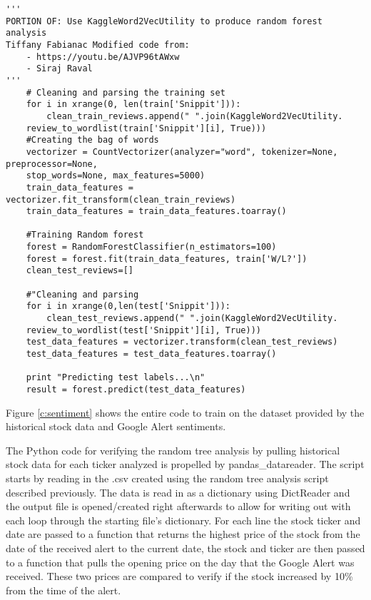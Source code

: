 \documentclass[sigconf]{acmart}
\begin{document}
\begin{figure*}[htb]
\begin{verbatim}
'''
PORTION OF: Use KaggleWord2VecUtility to produce random forest analysis 
Tiffany Fabianac Modified code from:
    - https://youtu.be/AJVP96tAWxw
    - Siraj Raval
'''
    # Cleaning and parsing the training set
    for i in xrange(0, len(train['Snippit'])):
        clean_train_reviews.append(" ".join(KaggleWord2VecUtility.
    review_to_wordlist(train['Snippit'][i], True)))
    #Creating the bag of words
    vectorizer = CountVectorizer(analyzer="word", tokenizer=None, preprocessor=None, 
    stop_words=None, max_features=5000)
    train_data_features = vectorizer.fit_transform(clean_train_reviews)
    train_data_features = train_data_features.toarray()

    #Training Random forest
    forest = RandomForestClassifier(n_estimators=100)
    forest = forest.fit(train_data_features, train['W/L?'])
    clean_test_reviews=[]

    #"Cleaning and parsing
    for i in xrange(0,len(test['Snippit'])):
        clean_test_reviews.append(" ".join(KaggleWord2VecUtility.
    review_to_wordlist(test['Snippit'][i], True)))
    test_data_features = vectorizer.transform(clean_test_reviews)
    test_data_features = test_data_features.toarray()

    print "Predicting test labels...\n"
    result = forest.predict(test_data_features)
\end{verbatim}
\caption{The Sentiment Python code takes the .csv exported by the historical stock script and parses the Snippets to train on the stock script and apply it to more recent stock quotes and Google Alerts}\label{c:sentiment}
\end{figure*}

Figure \ref{c:sentiment} shows the entire code to train on the dataset provided by the historical stock data and Google Alert sentiments.

The Python code for verifying the random tree analysis by pulling historical stock data for each ticker analyzed is propelled by pandas\_datareader. The script starts by reading in the .csv created using the random tree analysis script described previously. The data is read in as a dictionary using DictReader and the output file is opened/created right afterwards to allow for writing out with each loop through the starting file's dictionary. For each line the stock ticker and date are passed to a function that returns the highest price of the stock from the date of the received alert to the current date, the stock and ticker are then passed to a function that pulls the opening price on the day that the Google Alert was received. These two prices are compared to verify if the stock increased by 10\% from the time of the alert. 
\end{document}
